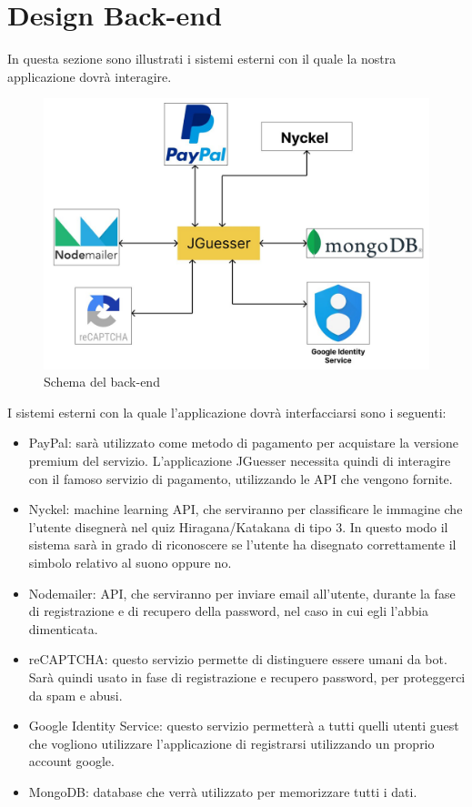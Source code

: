 \section{Design Back-end}
In questa sezione sono illustrati i sistemi esterni con il quale la nostra applicazione dovrà interagire.
\begin{figure}[!h]
\centering
\includegraphics[scale=0.35]{images/back_end.jpg}
\caption{Schema del back-end}
\label{fig:schema_back-end}
\end{figure}

I sistemi esterni con la quale l'applicazione dovrà interfacciarsi sono i seguenti:
\begin{itemize}
    \item PayPal: sarà utilizzato come metodo di pagamento per acquistare la versione premium del servizio. L'applicazione JGuesser necessita quindi di interagire con il famoso servizio di pagamento, utilizzando le API che vengono fornite.
    \item Nyckel: machine learning API, che serviranno per classificare le immagine che l'utente disegnerà nel quiz Hiragana/Katakana di tipo 3. In questo modo il sistema sarà in grado di riconoscere se l'utente ha disegnato correttamente il simbolo relativo al suono oppure no.
    \item Nodemailer: API, che serviranno per inviare email all'utente, durante la fase di registrazione e di recupero della password, nel caso in cui egli l'abbia dimenticata.
    \item reCAPTCHA: questo servizio permette di distinguere essere umani da bot. Sarà quindi usato in fase di registrazione e recupero password, per proteggerci da spam e abusi. 
    \item Google Identity Service: questo servizio permetterà a tutti quelli utenti guest che vogliono utilizzare l'applicazione di registrarsi utilizzando un proprio account google.
    \item MongoDB: database che verrà utilizzato per memorizzare tutti i dati.
\end{itemize}